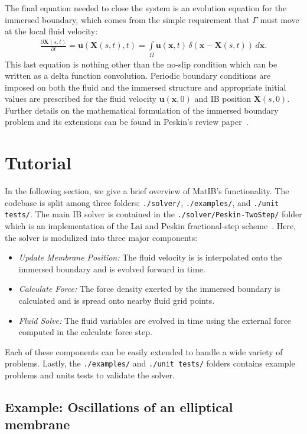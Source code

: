 \documentclass{article}
\newcommand{\mycode}[1]{\texttt{#1}}
\newcommand{\bs}[1]{\boldsymbol{#1}}
\newcommand{\pd}[2]{\frac{\partial #1}{\partial #2}}
\begin{document}
The final equation needed to close the system is an evolution equation
for the immersed boundary, which comes from the simple requirement that
$\Gamma$ must move at the local fluid velocity:
\begin{gather}
  \label{eq:membrane}
  \pd{\bs{X}(s,t)}{t} = \bs{u}(\bs{X}(s,t),t) = \int\limits_\Omega
  \bs{u}(\bs{x},t) \, \delta(\bs{x}-\bs{X}(s,t)) \, d\bs{x}. 
\end{gather}
This last equation is nothing other than the no-slip condition which can 
be written as a delta function convolution.  Periodic boundary conditions are imposed on both
the fluid and the immersed structure and appropriate initial values are
prescribed for the fluid velocity $\bs{u}(\bs{x},0)$ and IB position
$\bs{X}(s,0)$.  Further details on the mathematical formulation of the
immersed boundary problem and its extensions can be
found in Peskin's review paper~\cite{PeskinIB}.

\section{Tutorial}\label{sec:Tutorial}

In the following section, we give a brief overview of MatIB's functionality. The codebase is split
among three folders: \mycode{./solver/}, \mycode{./examples/}, and \mycode{./unit tests/}.
The main IB solver is contained in the \mycode{./solver/Peskin-TwoStep/} folder which 
is an implementation of the Lai and Peskin fractional-step scheme~\cite{PeskinIB}. Here, 
the solver is modulized into three major components:
\begin{itemize}
\item \emph{Update Membrane Position:} The fluid velocity is
  is interpolated onto the immersed boundary and is evolved forward in time.
\item \emph{Calculate Force:} The force density exerted by the
  immersed boundary is calculated and is spread onto nearby fluid grid points.
\item \emph{Fluid Solve:} The fluid variables are evolved in time
  using the external force computed in the calculate force step.
\end{itemize}
Each of these components can be easily extended to handle a wide variety of problems. 
Lastly, the \mycode{./examples/} and \mycode{./unit tests/} folders contains example problems 
and units tests to validate the solver. 

\subsection{Example: Oscillations of an elliptical membrane}\label{sec:EllipticalMembrane}
\end{document}
